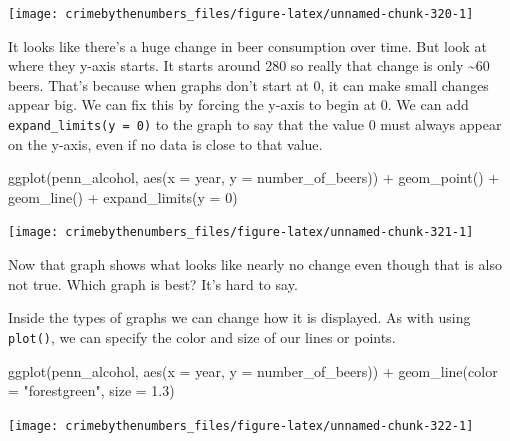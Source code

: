 \documentclass[
]{krantz}
\makeatletter
\newenvironment{Shaded}{\begin{snugshade}}{\end{snugshade}}
\newcommand{\AttributeTok}[1]{\textcolor[rgb]{0.61,0.61,0.61}{#1}}
\newcommand{\DecValTok}[1]{\textcolor[rgb]{0.06,0.06,0.06}{#1}}
\newcommand{\FloatTok}[1]{\textcolor[rgb]{0.06,0.06,0.06}{#1}}
\newcommand{\FunctionTok}[1]{\textcolor[rgb]{0,0,0}{#1}}
\newcommand{\NormalTok}[1]{#1}
\newcommand{\SpecialCharTok}[1]{\textcolor[rgb]{0,0,0}{#1}}
\newcommand{\StringTok}[1]{\textcolor[rgb]{0.5,0.5,0.5}{#1}}
\newenvironment{kframe}{%
\medskip{}
\setlength{\fboxsep}{.8em}
 \def\at@end@of@kframe{}%
 \ifinner\ifhmode%
  \def\at@end@of@kframe{\end{minipage}}%
  \begin{minipage}{\columnwidth}%
 \fi\fi%
 \def\FrameCommand##1{\hskip\@totalleftmargin \hskip-\fboxsep
 \colorbox{shadecolor}{##1}\hskip-\fboxsep
     \hskip-\linewidth \hskip-\@totalleftmargin \hskip\columnwidth}%
 \MakeFramed {\advance\hsize-\width
   \@totalleftmargin\z@ \linewidth\hsize
   \@setminipage}}%
 {\par\unskip\endMakeFramed%
 \at@end@of@kframe}
\renewenvironment{Shaded}{\begin{kframe}}{\end{kframe}}
\makeatother
\begin{document}
\begin{center}\texttt{[image: crimebythenumbers\_files/figure-latex/unnamed-chunk-320-1]} \end{center}

It looks like there's a huge change in beer consumption over time. But look at where they y-axis starts. It starts around 280 so really that change is only \textasciitilde60 beers. That's because when graphs don't start at 0, it can make small changes appear big. We can fix this by forcing the y-axis to begin at 0. We can add \texttt{expand\_limits(y\ =\ 0)} to the graph to say that the value 0 must always appear on the y-axis, even if no data is close to that value.

\begin{Shaded}
\begin{Highlighting}[]
\FunctionTok{ggplot}\NormalTok{(penn\_alcohol, }\FunctionTok{aes}\NormalTok{(}\AttributeTok{x =}\NormalTok{ year, }\AttributeTok{y =}\NormalTok{ number\_of\_beers)) }\SpecialCharTok{+}
  \FunctionTok{geom\_point}\NormalTok{() }\SpecialCharTok{+}
  \FunctionTok{geom\_line}\NormalTok{() }\SpecialCharTok{+}
  \FunctionTok{expand\_limits}\NormalTok{(}\AttributeTok{y =} \DecValTok{0}\NormalTok{)}
\end{Highlighting}
\end{Shaded}

\begin{center}\texttt{[image: crimebythenumbers\_files/figure-latex/unnamed-chunk-321-1]} \end{center}

Now that graph shows what looks like nearly no change even though that is also not true. Which graph is best? It's hard to say.

Inside the types of graphs we can change how it is displayed. As with using \texttt{plot()}, we can specify the color and size of our lines or points.

\begin{Shaded}
\begin{Highlighting}[]
\FunctionTok{ggplot}\NormalTok{(penn\_alcohol, }\FunctionTok{aes}\NormalTok{(}\AttributeTok{x =}\NormalTok{ year, }\AttributeTok{y =}\NormalTok{ number\_of\_beers)) }\SpecialCharTok{+}
  \FunctionTok{geom\_line}\NormalTok{(}\AttributeTok{color =} \StringTok{"forestgreen"}\NormalTok{, }\AttributeTok{size =} \FloatTok{1.3}\NormalTok{)}
\end{Highlighting}
\end{Shaded}

\begin{center}\texttt{[image: crimebythenumbers\_files/figure-latex/unnamed-chunk-322-1]} \end{center}
\end{document}
